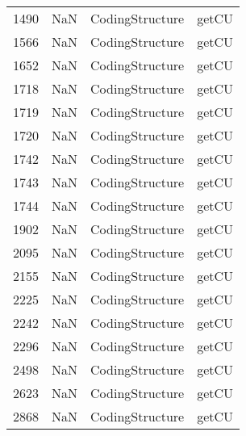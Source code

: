 \begin{tabular}{llll}
1490 &                   NaN &            CodingStructure &                                     getCU \\
1566 &                   NaN &            CodingStructure &                                     getCU \\
1652 &                   NaN &            CodingStructure &                                     getCU \\
1718 &                   NaN &            CodingStructure &                                     getCU \\
1719 &                   NaN &            CodingStructure &                                     getCU \\
1720 &                   NaN &            CodingStructure &                                     getCU \\
1742 &                   NaN &            CodingStructure &                                     getCU \\
1743 &                   NaN &            CodingStructure &                                     getCU \\
1744 &                   NaN &            CodingStructure &                                     getCU \\
1902 &                   NaN &            CodingStructure &                                     getCU \\
2095 &                   NaN &            CodingStructure &                                     getCU \\
2155 &                   NaN &            CodingStructure &                                     getCU \\
2225 &                   NaN &            CodingStructure &                                     getCU \\
2242 &                   NaN &            CodingStructure &                                     getCU \\
2296 &                   NaN &            CodingStructure &                                     getCU \\
2498 &                   NaN &            CodingStructure &                                     getCU \\
2623 &                   NaN &            CodingStructure &                                     getCU \\
2868 &                   NaN &            CodingStructure &                                     getCU \\

\end{tabular}

